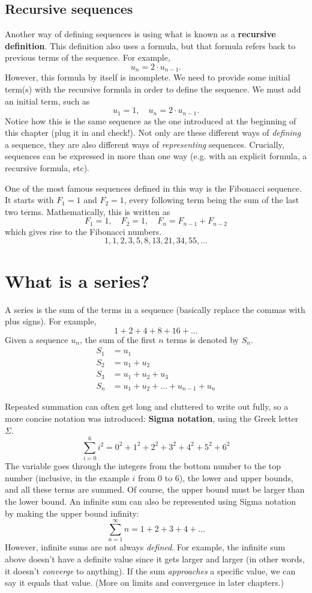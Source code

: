 \documentclass[../../main.tex]{subfiles}
\begin{document}
\subsection{Recursive sequences}

Another way of defining sequences is using what is known as a \textbf{recursive definition}. This definition also uses a formula, but that formula refers back to previous terms of the sequence. For example,
\[
    u_n = 2\cdot u_{n-1}.
\]
However, this formula by itself is incomplete. We need to provide some initial term(s) with the recursive formula in order to define the sequence. We must add an initial term, such as
\[
    u_1 = 1,\quad u_n = 2\cdot u_{n-1}.
\]
Notice how this is the same sequence as the one introduced at the beginning of this chapter (plug it in and check!). Not only are these different ways of \emph{defining} a sequence, they are also different ways of \emph{representing} sequences. Crucially, sequences can be expressed in more than one way (e.g. with an explicit formula, a recursive formula, etc).

One of the most famous sequences defined in this way is the Fibonacci sequence. It starts with \(F_1 = 1\) and \(F_2 = 1\), every following term being the sum of the last two terms. Mathematically, this is written as
\[
    F_1 = 1,\quad F_2 = 1,\quad F_n = F_{n-1} + F_{n-2}
\]
which gives rise to the Fibonacci numbers.
\[
    1, 1, 2, 3, 5, 8, 13, 21, 34, 55, \ldots
\]

\section{What is a series?}

A series is the sum of the terms in a sequence (basically replace the commas with plus signs). For example,
\[
    1+2+4+8+16+\ldots
\]
Given a sequence \( u_n\), the sum of the first \(n\) terms is denoted by \(S_n\).
\begin{align}
    S_1 &= u_1\\
    S_2 &= u_1 + u_2\\
    S_3 &= u_1 + u_2 + u_3\\
    S_n &= u_1 + u_2 + \ldots + u_{n-1} + u_n
\end{align}

Repeated summation can often get long and cluttered to write out fully, so a more concise notation was introduced: \textbf{Sigma notation}, using the Greek letter \(\Sigma\).
\[
    \sum_{i=0}^6i^2 = 0^2 + 1^2 + 2^2 + 3^2 + 4^2 + 5^2 + 6^2
\]
The variable goes through the integers from the bottom number to the top number (inclusive, in the example \(i\) from 0 to 6), the lower and upper bounds, and all these terms are summed. Of course, the upper bound must be larger than the lower bound. An infinite sum can also be represented using Sigma notation by making the upper bound infinity:
\[
    \sum_{n=1}^{\infty}n = 1 + 2 + 3 + 4 + \ldots
\]
However, infinite sums are not always \emph{defined}. For example, the infinite sum above doesn't have a definite value since it gets larger and larger (in other words, it doesn't \emph{converge} to anything). If the sum \emph{approaches} a specific value, we can say it equals that value. (More on limits and convergence in later chapters.)
\end{document}
